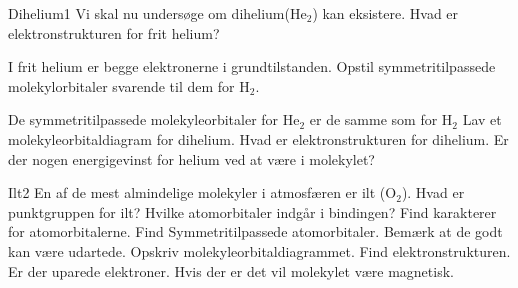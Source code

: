 \begin{opgave}{Dihelium}{1}
Vi skal nu undersøge om dihelium(He$_2$) kan eksistere.
\opg Hvad er elektronstrukturen for frit helium?

I frit helium er begge elektronerne i grundtilstanden.
\opg Opstil symmetritilpassede molekylorbitaler svarende til dem for H$_2$.

De symmetritilpassede molekyleorbitaler for He$_2$ er de samme som for H$_2$
\opg Lav et molekyleorbitaldiagram for dihelium.
\opg Hvad er elektronstrukturen for dihelium.
\opg Er der nogen energigevinst for helium ved at være i molekylet?
\end{opgave}
\begin{opgave}{Ilt}{2}
En af de mest almindelige molekyler i atmosfæren er ilt (O$_2$).
\opg Hvad er punktgruppen for ilt?
\opg Hvilke atomorbitaler indgår i bindingen?
\opg Find karakterer for atomorbitalerne.
\opg Find Symmetritilpassede atomorbitaler. Bemærk at de godt kan være udartede.
\opg Opskriv molekyleorbitaldiagrammet.
\opg Find elektronstrukturen.
\opg Er der uparede elektroner. Hvis der er det vil molekylet være magnetisk.
\end{opgave}